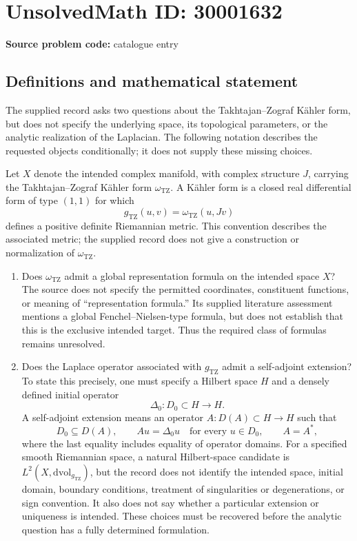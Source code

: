\documentclass[11pt]{article}
\begin{document}
\section*{UnsolvedMath ID: 30001632}
\textbf{Source problem code:} catalogue entry
\subsection{Definitions and mathematical statement}
The supplied record asks two questions about the Takhtajan--Zograf Kähler form, but does not specify the underlying space, its topological parameters, or the analytic realization of the Laplacian. The following notation describes the requested objects conditionally; it does not supply these missing choices.

Let \(X\) denote the intended complex manifold, with complex structure \(J\), carrying the Takhtajan--Zograf Kähler form \(\omega_{\mathrm{TZ}}\). A Kähler form is a closed real differential form of type \((1,1)\) for which
\[
 g_{\mathrm{TZ}}(u,v)=\omega_{\mathrm{TZ}}(u,Jv)
\]
defines a positive definite Riemannian metric. This convention describes the associated metric; the supplied record does not give a construction or normalization of \(\omega_{\mathrm{TZ}}\).

\begin{enumerate}
\item Does \(\omega_{\mathrm{TZ}}\) admit a global representation formula on the intended space \(X\)? The source does not specify the permitted coordinates, constituent functions, or meaning of ``representation formula.'' Its supplied literature assessment mentions a global Fenchel--Nielsen-type formula, but does not establish that this is the exclusive intended target. Thus the required class of formulas remains unresolved.
\item Does the Laplace operator associated with \(g_{\mathrm{TZ}}\) admit a self-adjoint extension? To state this precisely, one must specify a Hilbert space \(H\) and a densely defined initial operator
\[
 \Delta_0\colon D_0\subset H\longrightarrow H.
\]
A self-adjoint extension means an operator \(A\colon D(A)\subset H\to H\) such that
\[
 D_0\subseteq D(A),\qquad
 Au=\Delta_0u\quad\text{for every }u\in D_0,
 \qquad A=A^*,
\]
where the last equality includes equality of operator domains. For a specified smooth Riemannian space, a natural Hilbert-space candidate is \(L^2(X,\mathrm{dvol}_{g_{\mathrm{TZ}}})\), but the record does not identify the intended space, initial domain, boundary conditions, treatment of singularities or degenerations, or sign convention. It also does not say whether a particular extension or uniqueness is intended. These choices must be recovered before the analytic question has a fully determined formulation.
\end{enumerate}
\end{document}
